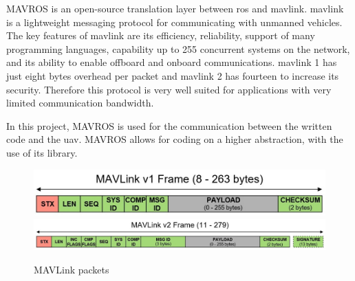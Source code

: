 MAVROS is an open\hyp{}source translation layer between \acs{ros} and \acs{mavlink}. \acs{mavlink} is a lightweight messaging protocol for communicating with unmanned vehicles. The key features of \acs{mavlink} are its efficiency, reliability, support of many programming languages, capability up to 255 concurrent systems on the network, and its ability to enable offboard and onboard communications. \acs{mavlink} 1 has just eight bytes overhead per packet and \acs{mavlink} 2 has fourteen to increase its security. Therefore this protocol is very well suited for applications with very limited communication bandwidth. \cite{mavlink_developer_guide}

In this project, MAVROS is used for the communication between the written code and the \acs{uav}. MAVROS allows for coding on a higher abstraction, with the use of its library.

\begin{figure}[!h]
  \centering
  \includegraphics[width=0.65\linewidth]{images/packet_mavlink_v1.jpg}
  \includegraphics[width=\linewidth]{images/packet_mavlink_v2.jpg}
  \caption{MAVLink packets \cite{mavlink_packet_serialization}}
\end{figure}

